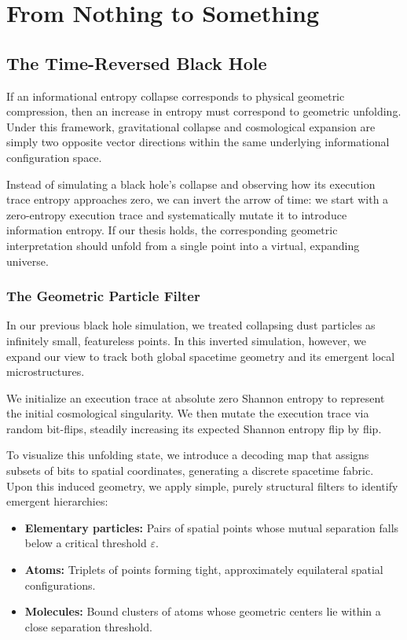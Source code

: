 \chapter{From Nothing to Something}
\label{chap:from-nothing-to-something}

\section{The Time-Reversed Black Hole}

If an informational entropy collapse corresponds to physical geometric compression, then an increase in entropy must correspond to geometric unfolding. Under this framework, gravitational collapse and cosmological expansion are simply two opposite vector directions within the same underlying informational configuration space. 

Instead of simulating a black hole's collapse and observing how its execution trace entropy approaches zero, we can invert the arrow of time: we start with a zero-entropy execution trace and systematically mutate it to introduce information entropy. If our thesis holds, the corresponding geometric interpretation should unfold from a single point into a virtual, expanding universe.

\subsection*{The Geometric Particle Filter}

In our previous black hole simulation, we treated collapsing dust particles as infinitely small, featureless points. In this inverted simulation, however, we expand our view to track both global spacetime geometry and its emergent local microstructures.

We initialize an execution trace at absolute zero Shannon entropy to represent the initial cosmological singularity. We then mutate the execution trace via random bit-flips, steadily increasing its expected Shannon entropy flip by flip.

To visualize this unfolding state, we introduce a decoding map that assigns subsets of bits to spatial coordinates, generating a discrete spacetime fabric. Upon this induced geometry, we apply simple, purely structural filters to identify emergent hierarchies:

\begin{itemize}
    \item \textbf{Elementary particles:} Pairs of spatial points whose mutual separation falls below a critical threshold $\varepsilon$.
    \item \textbf{Atoms:} Triplets of points forming tight, approximately equilateral spatial configurations.
    \item \textbf{Molecules:} Bound clusters of atoms whose geometric centers lie within a close separation threshold.
\end{itemize}

